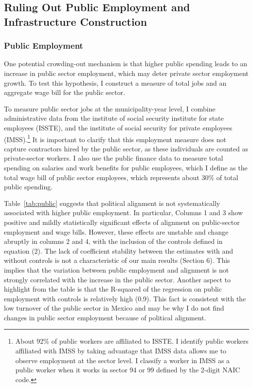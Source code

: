 \documentclass[dv_diss_main.tex]{subfiles}
\begin{document}
\subsection{Ruling Out Public Employment and Infrastructure Construction}

\subsubsection{Public Employment}  One potential crowding-out mechanism is that higher public spending leads to an increase in public sector employment, which may deter private sector employment growth. To test this hypothesis, I construct a measure of total jobs and an aggregate wage bill for the public sector.

To measure public sector jobs at the municipality-year level, I combine administrative data from the institute of social security institute for state employees (ISSTE), and the institute of social security for private employees (IMSS).\footnote{ About 92\% of public workers are affiliated to ISSTE. I identify public workers affiliated with IMSS by taking advantage that IMSS data allows me to observe employment at the sector level. I classify a worker in IMSS as a public worker when it works in sector 94 or 99 defined by the 2-digit NAIC code.} It is important to clarify that this employment measure does not capture contractors hired by the public sector, as these individuals are counted as private-sector workers. I also use the public finance data to measure total spending on salaries and work benefits for public employees, which I define as the total wage bill of public sector employees, which represents about 30\% of total public spending. 

Table~\ref{tab:public} suggests that political alignment is not systematically associated with higher public employment. In particular, Columns 1 and 3 show positive and mildly statistically significant effects of alignment on public-sector employment and wage bills. However, these effects are unstable and change abruptly in columns 2 and 4, with the inclusion of the controls defined in equation (2). The lack of coefficient stability between the estimates with and without controls is not a characteristic of our main results (Section 6). This implies that the variation between public employment and alignment is not strongly correlated with the increase in the public sector.  Another aspect to highlight from the table is that the R-squared of the regression on public employment with controls is relatively high (0.9). This fact is consistent with the low turnover of the public sector in Mexico and may be why I do not find changes in public sector employment because of political alignment.
\end{document}
